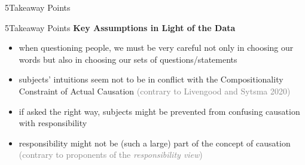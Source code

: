 \documentclass[xcolor=table,9pt,aspectratio=169]{beamer}
\begin{document}
\begin{frame}
\begin{overlayarea}{\textwidth}{0.81\paperheight}{
   \vspace*{11mm}
   \textcolor{uolblue}
   {5\hspace*{1em}Takeaway Points}
}
\end{overlayarea}
\end{frame}


\begin{frame}{\vspace*{10mm}5\hspace*{1em}Takeaway Points}
\vspace*{-5mm}
\textbf{Key Assumptions in Light of the Data}
\begin{itemize}
   \item when questioning people, we must be very careful not only in choosing our words but also in choosing our sets of questions/statements
   \item subjects' intuitions seem not to be in conflict with the Compositionality Constraint of Actual Causation \textcolor{gray}{(contrary to Livengood and Sytsma 2020)}
   \item if asked the right way, subjects might be prevented from confusing causation with responsibility
   \item responsibility might not be (such a large) part of the concept of causation \textcolor{gray}{(contrary to proponents of the \textit{responsibility view})}
\end{itemize}
\end{frame}
\end{document}
